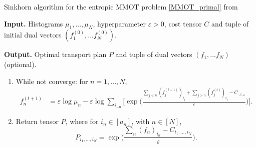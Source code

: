 \documentclass{article}
\begin{document}
\begin{algorithm}[H]
  \caption{Sinkhorn algorithm for the entropic MMOT problem \ref{MMOT_primal}
  from \cite{Benamou14}}
  \textbf{Input.} Histograms $\mu_1,...,\mu_N$, hyperparameter $\varepsilon > 0$, cost tensor $C$ and 
  tuple of initial dual vectors $(f^{(0)}_1, ... f^{(0)}_N)$.

  \textbf{Output.} Optimal transport plan $P$ and tuple of dual vectors $(f_1, ... f_N)$ (optional).
  \begin{enumerate}
    \item While not converge: for $n = 1, ..., N$,
    \begin{equation*}
      \begin{split}
        f^{(t+1)}_n &= \varepsilon \log \mu_n - \varepsilon \log \sum_{i_{-n}} 
        \Big[ \exp\Big( \frac{\sum_{j < n} (f^{(t+1)}_j)_{i_j} + \sum_{j > n} (f^{(t)}_j)_{i_j} - 
        C_{\cdot, i_{-n}}}{\varepsilon} \Big) \Big].
      \end{split}
    \end{equation*}
    \item Return tensor $P$, where for $i_n \in [a_n]$, with $n \in [N]$,
    \begin{equation*}
      P_{i_1,...,i_N} = \exp\Big( \frac{\sum_n (f_n)_{i_n} - C_{i_1,...,i_N}}{\varepsilon} \Big).
    \end{equation*}
  \end{enumerate}
  \label{algo:dual_mmot}
\end{algorithm}
\end{document}
